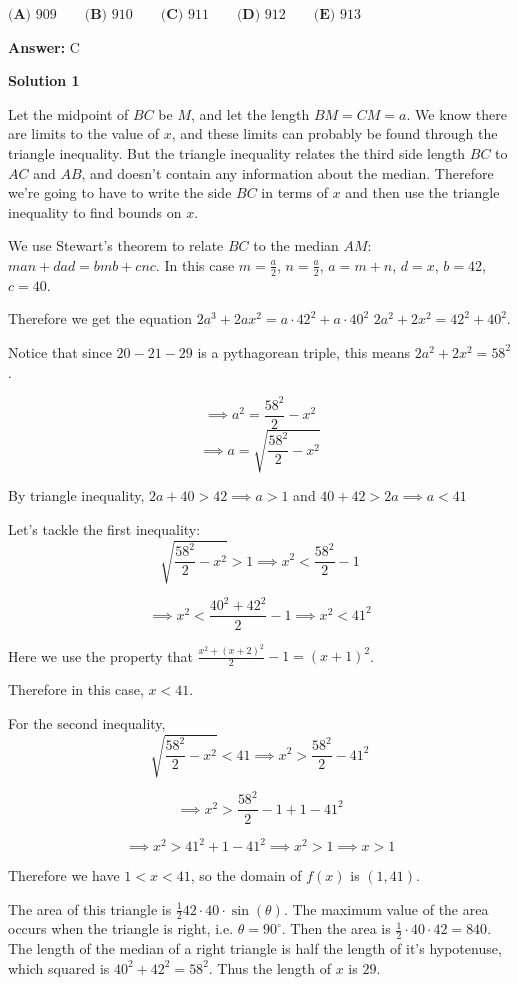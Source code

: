\begin{enumerate}
 $\textbf{(A) }909\qquad \textbf{(B) }910\qquad \textbf{(C) }911\qquad \textbf{(D) }912\qquad \textbf{(E) }913\qquad$

 \textbf{Answer: }C



\textbf{Solution 1}

Let the midpoint of $BC$ be $M$, and let the length $BM = CM = a$. We know there are limits to the value of $x$, and these limits can probably be found through the triangle inequality. But the triangle inequality relates the third side length $BC$ to $AC$ and $AB$, and doesn't contain any information about the median. Therefore we're going to have to write the side $BC$ in terms of $x$ and then use the triangle inequality to find bounds on $x$.

 We use Stewart's theorem to relate $BC$ to the median $AM$: $man + dad = bmb + cnc$. In this case $m = \frac{a}2$, $n=\frac{a}2$, $a = m+n$, $d = x$, $b = 42$, $c = 40$.

 Therefore we get the equation $2a^3 + 2ax^2 = a \cdot 42^2 + a \cdot 40^2$
$2a^2 + 2x^2 = 42^2 + 40^2$. 

 Notice that since $20-21-29$ is a pythagorean triple, this means $2a^2 + 2x^2 = 58^2$. 

 
 \[\implies a^2 = \frac{58^2}{2}-x^2\]
 \[\implies a = \sqrt{\frac{58^2}{2}-x^2}\]

 By triangle inequality, $2a+40>42 \implies a>1$ and $40+42>2a \implies a<41$

 Let's tackle the first inequality: 
 \[\sqrt{\frac{58^2}{2}-x^2}>1 \implies x^2 < \frac{58^2}{2}-1\]

 \[\implies x^2 < \frac{40^2+42^2}{2}-1 \implies x^2<41^2\]

 Here we use the property that $\frac{x^2+(x+2)^2}{2}-1 = (x+1)^2$.

 Therefore in this case, $x<41$.

 For the second inequality, 
 \[\sqrt{\frac{58^2}{2}-x^2} < 41 \implies x^2 > \frac{58^2}{2}-41^2\]

 \[\implies x^2 > \frac{58^2}{2}-1 + 1 - 41^2\]

 \[\implies x^2 > 41^2 + 1 - 41^2 \implies x^2 > 1 \implies x > 1\]

 Therefore we have $1<x<41$, so the domain of $f(x)$ is $(1,41)$.

 
The area of this triangle is $\frac{1}{2} 42 \cdot 40 \cdot \sin(\theta)$. The maximum value of the area occurs when the triangle is right, i.e. $\theta = 90^{\circ}$. Then the area is $\frac{1}{2} \cdot 40 \cdot 42 = 840$. The length of the median of a right triangle is half the length of it's hypotenuse, which squared is $40^2+42^2 = 58^2$. Thus the length of $x$ is $29$.


\end{enumerate}
